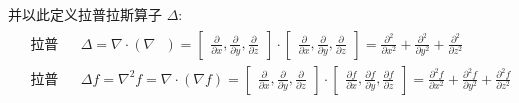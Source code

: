 \documentclass[UTF8]{report}
\theoremstyle{MyLineTheoremStyle} %
\theoremstyle{MyBlockTheoremStyle} %
\theoremstyle{MySubsubsectionStyle} %
\begin{document}
并以此定义拉普拉斯算子 $\Delta$: 
\begin{gather}
\begin{aligned}
    &\text{拉普拉斯算子：}
    &&\Delta = \nabla \cdot (\nabla \ \ \ ) 
    =  
    \begin{bmatrix}
        \frac{\partial  }{\partial x }, \frac{\partial  }{\partial y }, \frac{\partial  }{\partial z }
    \end{bmatrix} \cdot 
    \begin{bmatrix}
        \frac{\partial  }{\partial x }, \frac{\partial  }{\partial y }, \frac{\partial  }{\partial z }
    \end{bmatrix}
    = 
    \frac{\partial^2 }{\partial x^2 } +\frac{\partial^2 }{\partial y^2 } + \frac{\partial^2 }{\partial z^2 } \\ 
    &\text{拉普拉斯运算：} &&\Delta f = \nabla^2 f = \nabla \cdot (\nabla f ) 
    = 
    \begin{bmatrix}
        \frac{\partial  }{\partial x }, \frac{\partial  }{\partial y }, \frac{\partial  }{\partial z }
    \end{bmatrix} 
    \cdot 
    \begin{bmatrix}
        \frac{\partial f }{\partial x }, \frac{\partial f }{\partial y }, \frac{\partial f }{\partial z }
    \end{bmatrix}
    =
    \frac{\partial^2 f }{\partial x^2 } +\frac{\partial^2 f }{\partial y^2 } + \frac{\partial^2 f }{\partial z^2 } 
\end{aligned}
\end{gather}
\end{document}

